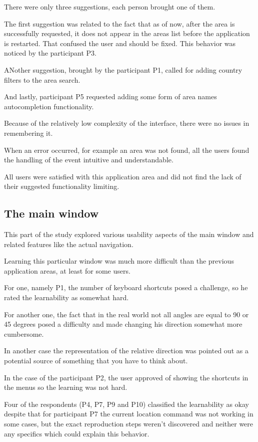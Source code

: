 \documentclass[nolof,digital]{fithesis3}
\begin{document}
There were only three suggestions, each person brought one of them.

The first suggestion was related to the fact that as of now, after the area is successfully requested, it does not appear in the areas list before the application is restarted. That confused the user and should be fixed. This behavior was noticed by the participant P3.

ANother suggestion, brought by the participant P1, called for adding country filters to the area search. 

And lastly, participant P5 requested adding some form of area names autocompletion functionality.

Because of the relatively low complexity of the interface, there were no issues in remembering it.

When an error occurred, for example an area was not found, all the users found the handling of the event intuitive and understandable.

All users were satisfied with this application area and did not find the lack of their suggested functionality limiting.
\subsection{The main window}
This part of the study explored various usability aspects of the main window and related features like the actual navigation.

Learning this particular window was much more difficult than the previous application areas, at least for some users.

For one, namely P1, the number of keyboard shortcuts posed a challenge, so he rated the learnability as somewhat hard.

For another one, the fact that in the real world not all angles are equal to 90 or 45 degrees posed a difficulty and made changing his direction somewhat more cumbersome.

In another case the representation of the relative direction was pointed out as a potential source of something that you have to think about.

In the case of the participant P2, the user approved of showing the shortcuts in the menus so the learning was not hard.

Four of the respondents (P4, P7, P9 and P10) classified the learnability as okay despite that for participant P7 the current location command was not working in some cases, but the exact reproduction steps weren't discovered and neither were any specifics which could explain this behavior.
\end{document}
